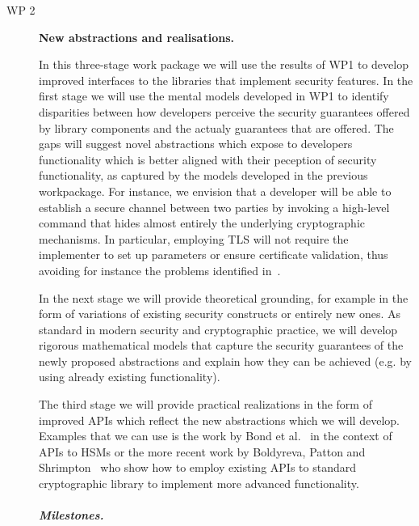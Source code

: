 \documentclass[10pt]{article}
\begin{document}
\begin{description}
\item[WP 2] \textbf{New abstractions and realisations.} 

In this three-stage work package we will use the results of WP1 to develop improved interfaces to the libraries that implement security features.  
In the first stage we will use the mental models developed in WP1 to identify disparities between how developers perceive the security guarantees offered by library components and the actualy guarantees that are offered. The gaps will suggest novel abstractions which expose to developers functionality which is better aligned with their peception of security functionality, as captured by the models developed in the previous workpackage. 
For instance, we envision that a developer will be able to establish a secure channel between two parties by invoking a high-level command that hides almost entirely the underlying cryptographic mechanisms.   In particular, employing TLS will not require the implementer to set up parameters or ensure certificate validation, thus avoiding for instance the problems identified in~\cite{GIJABS12}. 

In the next stage we will provide theoretical grounding, for example in the form of variations of existing security constructs or entirely new ones.  As standard in modern security and cryptographic practice, we will develop rigorous mathematical models that capture the security guarantees of the newly proposed abstractions and explain how they can be achieved (e.g. by using already existing functionality).  


 The third stage we will provide practical realizations in the form of improved APIs which reflect the new abstractions which we will develop.  
Examples that we can use is the work by Bond et al.~\cite{bond2013low} in the context of APIs to HSMs or the more recent work by Boldyreva, Patton and Shrimpton~\cite{C:BolPatShr17} who show how to employ existing APIs to standard cryptographic library to implement more advanced functionality.
\vspace{.3cm}
\iffalse
Technically, we will provide wrappers to some of the most commonly used libraries.  
We remark that improved APIs is one of the feature of the NaCl cryptographic library~\cite{bernstein}; currently that library only considers lower level primitives.  
\fi




\vspace{-\baselineskip}
\subparagraph{Milestones.}

\begin{itemize}


\end{itemize}
\end{description}
\end{document}
